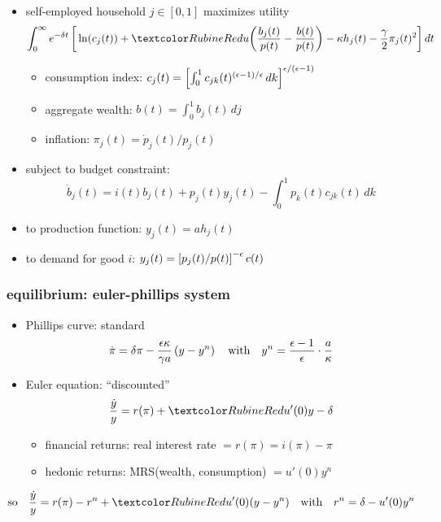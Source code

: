 \documentclass[12pt,xcolor={dvipsnames},hyperref={pdftex,pdfpagemode=UseNone,hidelinks,pdfdisplaydoctitle=true},usepdftitle=false]{beamer}
\begin{document}
\begin{frame}
\end{frame}

\begin{frame}
\begin{itemize}
\item self-employed household $j \in [0,1]$ maximizes utility
\begin{equation*}
\int_{0}^{\infty}e^{-\d t} \bs{\ln{c_{j}(t)}+\al{u\of{\frac{b_{j}(t)}{p(t)}-\frac{b(t)}{p(t)}}}- \k h_{j}(t)-\frac{\g}{2} \pi_{j}(t)^2}dt
\end{equation*}
\vspace{-0.5cm}
\begin{itemize}
\item consumption index: $c_{j}(t) = \left[ \int_{0}^{1}c_{jk}(t)^{(\epsilon-1)/\epsilon}\,dk \right]^{\epsilon/(\epsilon-1)}$
\item aggregate wealth:  $b(t) = \int_{0}^{1} b_{j}(t)\,dj$
\item inflation: $\pi_{j}(t) = \dot{p}_{j}(t)/p_{j}(t)$
\end{itemize}
\item  subject to budget constraint:
\begin{equation*}
\dot{b}_{j}(t) = i(t) b_{j}(t) + p_{j}(t)  y_{j}(t) - \int_0^1 p_{k}(t) c_{jk}(t)\,dk
\end{equation*}
\item to production function: $y_{j}(t) = a h_{j}(t)$
\item to demand for good $i$: $y_{j}(t) = \left[ p_{j}(t)/p(t) \right]^{-\epsilon}  c(t) $ 
\end{itemize}
\end{frame}

\begin{frame}
\frametitle{equilibrium: euler-phillips system}
\begin{itemize}
\item Phillips curve: standard
\begin{equation*}
\dot{\pi} = \delta\pi- \frac{\epsilon\kappa}{\gamma a} \left( y - y^n \right) \quad \text{with} \quad y^n = \frac{\epsilon-1}{\epsilon} \cdot \frac{a}{\kappa}
\end{equation*}
\item Euler equation: ``discounted''
\begin{equation*}
\frac{\dot{y}}{y} = r(\pi) + \al{u'(0) y} -\d
\end{equation*}
\vspace{-1cm}
\begin{itemize}
\item financial returns: real interest rate $= r(\pi) = i(\pi)-\pi$
\item hedonic returns: MRS(wealth, consumption) $= u'(0)y^n$ 
\end{itemize}
\end{itemize}
\begin{equation*}
\text{so} \quad \frac{\dot{y}}{y} = r(\pi)- r^n + \al{u'(0)} (y-y^n)\quad \text{with} \quad r^n =\d-u'(0)y^n
\end{equation*}

\end{frame}
\end{document}
